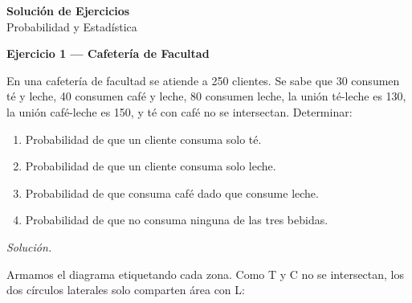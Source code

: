 \documentclass[12pt,letterpaper]{article}
\begin{document}
\begin{center}
  {\large \textbf{Solución de Ejercicios}}\\[0.3em]
  Probabilidad y Estadística
\end{center}

\bigskip

\textbf{Ejercicio 1 — Cafetería de Facultad}

\medskip
En una cafetería de facultad se atiende a 250 clientes. Se sabe que 30 consumen
té y leche, 40 consumen café y leche, 80 consumen leche, la unión té-leche es 130,
la unión café-leche es 150, y té con café no se intersectan. Determinar:
\begin{enumerate}[label=\alph*)]
  \item Probabilidad de que un cliente consuma solo té.
  \item Probabilidad de que un cliente consuma solo leche.
  \item Probabilidad de que consuma café dado que consume leche.
  \item Probabilidad de que no consuma ninguna de las tres bebidas.
\end{enumerate}

\medskip
\textit{Solución.}

Armamos el diagrama etiquetando cada zona. Como T y C no se intersectan,
los dos círculos laterales solo comparten área con L:

\begin{center}
\end{center}
\end{document}
